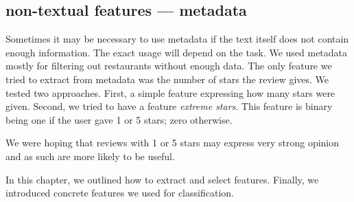 \subsection{non-textual features --- metadata}

Sometimes it may be necessary to use metadata
if the text itself does not contain enough information.
The exact usage will depend on the task.
We used metadata mostly for filtering out restaurants without enough data.
The only feature we tried to extract from metadata was the number of stars the review gives.
We tested two approaches.
First, a simple feature expressing how many stars were given.
Second, we tried to have a feature \textit{extreme stars}.
This feature is binary being one if the user gave 1 or 5 stars;
zero otherwise.

We were hoping that reviews with 1 or 5 stars may express very strong opinion
and as such are more likely to be useful.

In this chapter, we outlined how to extract and select features.
Finally, we introduced concrete features we used for classification.
